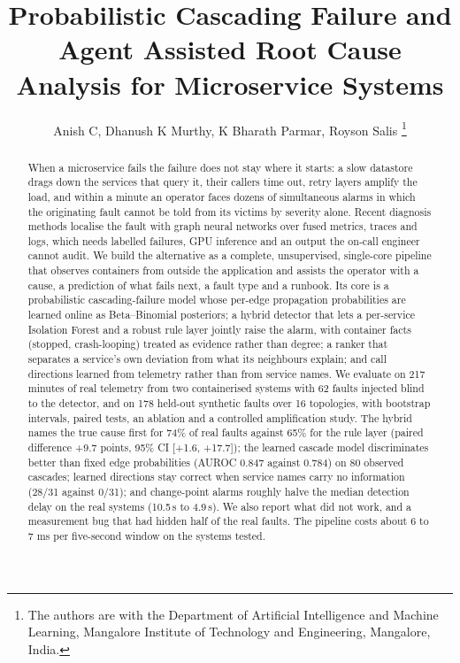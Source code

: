 \documentclass[journal]{IEEEtran}
\begin{document}
\title{Probabilistic Cascading Failure and Agent Assisted Root Cause Analysis for Microservice Systems}

\author{Anish C, Dhanush K Murthy, K Bharath Parmar, Royson Salis
\thanks{The authors are with the Department of Artificial Intelligence and Machine Learning, Mangalore Institute of Technology and Engineering, Mangalore, India.}}


\maketitle

\begin{abstract}
When a microservice fails the failure does not stay where it starts: a slow datastore drags down the services that query it,
their callers time out, retry layers amplify the load, and within a minute an operator faces dozens of simultaneous alarms in
which the originating fault cannot be told from its victims by severity alone. Recent diagnosis methods localise the fault with
graph neural networks over fused metrics, traces and logs, which needs labelled failures, GPU inference and an output the
on-call engineer cannot audit. We build the alternative as a complete, unsupervised, single-core pipeline that observes
containers from outside the application and assists the operator with a cause, a prediction of what fails next, a fault type
and a runbook. Its core is a probabilistic cascading-failure model whose per-edge propagation probabilities are learned online
as Beta--Binomial posteriors; a hybrid detector that lets a per-service Isolation Forest and a robust rule layer jointly raise the
alarm, with container facts (stopped, crash-looping) treated as evidence rather than degree; a ranker that separates a service's
own deviation from what its neighbours explain; and call directions learned from telemetry rather than from service names.
We evaluate on 217 minutes of real telemetry from two containerised systems with 62 faults injected blind to the detector, and
on 178 held-out synthetic faults over 16 topologies, with bootstrap intervals, paired tests, an ablation and a
controlled amplification study. The hybrid names the true cause first for 74\% of real faults against 65\% for the rule layer
(paired difference +9.7 points, 95\% CI [+1.6, +17.7]); the learned cascade model discriminates better than fixed edge
probabilities (AUROC 0.847 against 0.784) on 80 observed cascades; learned directions stay correct when service names carry no
information (28/31 against 0/31); and change-point alarms roughly halve the median detection delay on the real systems
(10.5\,s to 4.9\,s). We also report what did not work, and a measurement bug that had hidden half of the real faults. The
pipeline costs about 6 to 7 ms per five-second window on the systems tested.
\end{abstract}
\end{document}
